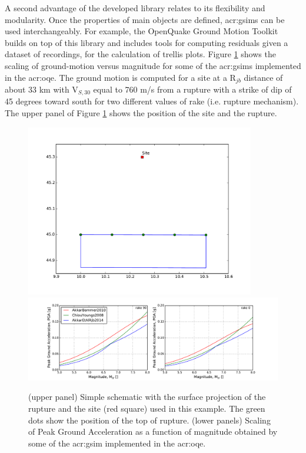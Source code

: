A second advantage of the developed library relates to its flexibility 
and modularity. Once the properties of main objects are defined, 
\glspl{acr:gsim} can be used interchangeably. 
%
For example, the OpenQuake Ground Motion Toolkit 
\parencite{weatherill2014} builds on top of this library and 
includes tools for computing residuals given a dataset 
of recordings, for the calculation of trellis plots.
%
Figure \ref{fig:gsim_mag_scaling} shows the scaling of ground-motion 
versus magnitude for some of the \glspl{acr:gsim} implemented in the 
\gls{acr:oqe}.
%
The ground motion is computed for a site at a R$_{jb}$ distance of 
about 33 km with V$_{S,30}$ equal to 760 m/s from a rupture with a 
strike of dip of 45 degrees toward south for two different values 
of rake (i.e. rupture mechanism). The upper panel of Figure 
\ref{fig:gsim_mag_scaling} shows the position of the site and 
the rupture.
\begin{figure}[hb]
\centering
\includegraphics[width=10cm]{./Pictures/gsim/rupture_plot.pdf}
\includegraphics[trim = 23mm 0mm 23mm 5mm, clip, width=\textwidth]
    {./Pictures/gsim/mag_scaling_example.pdf}
    \caption{
        (upper panel)
        Simple schematic with the surface projection of the 
        rupture and the site (red square) used in this example. 
        The green dots show the position of the top of rupture.
        (lower panels)
        Scaling of Peak Ground Acceleration as a function 
        of magnitude obtained by some of the \gls{acr:gsim} 
        implemented in the \gls{acr:oqe}. 
    }
\label{fig:gsim_mag_scaling}
\end{figure}
%
